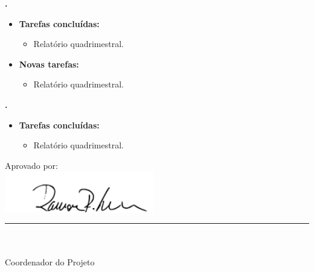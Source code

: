  \textbf{\renan.} 
	\begin{itemize}
		\item \textbf{Tarefas concluídas:}
			\begin{itemize}    
			\item Relatório quadrimestral.
			\end{itemize}
		
		\item \textbf{Novas tarefas:}
			\begin{itemize} 
			\item Relatório quadrimestral.
			\end{itemize}
	\end{itemize}	
			
   \textbf{\julia.} 
	\begin{itemize}
		\item \textbf{Tarefas concluídas:}
			\begin{itemize}    
				\item Relatório quadrimestral.
			\end{itemize}
		
	\end{itemize}		





\vspace{5mm}%
\parbox[t]{70mm}{
  Aprovado por: \\[5mm]
  \centering
  \includegraphics[width=65mm]{figs/logo/assinatura-ramon.png} \\[-4mm]
  \rule[2mm]{70mm}{0.1mm} \\
  \ramon \\[1mm]
  Coordenador do Projeto \\
}

\fim